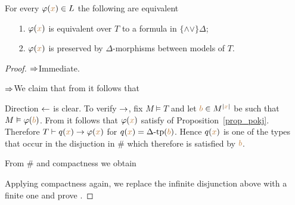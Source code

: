 \begin{lemma}\label{lem_qfdefinability}
For every $\varphi({\color{brown} x})\in L$ the following are equivalent
\begin{itemize}
\item[1.] $\varphi({\color{brown} x})$ is equivalent over $T$ to a formula in $\{\mathord\wedge\mathord\vee\}\Delta$;
\item[2.] $\varphi({\color{brown} x})$ is preserved by $\Delta$-morphisms between models of $T$.
\end{itemize}
\end{lemma}
\begin{proof} $\Rightarrow$\quad Immediate.

$\Rightarrow$\quad  We claim that from  it follows that



Direction $\leftarrow$ is clear. To verify $\rightarrow$, fix $M\models T$ and let ${\color{brown} b}\in M^{|{\color{brown} x}|}$ be such that $M\vDash\varphi({\color{brown} b})$.  From  it follows that $\varphi({\color{brown} x})$ satisfy  of Proposition~\ref{prop_pokj}. Therefore $T\vdash q({\color{brown} x})\rightarrow\varphi({\color{brown} x})$ for $q({\color{brown} x})=\Delta\mbox{-}\textrm{tp}({\color{brown} b})$. Hence $q({\color{brown} x})$ is one of the types that occur in the disjuction in $\#$ which therefore is satisfied by ${\color{brown} b}$.

From $\#$ and compactness we obtain


Applying compactness again, we replace the infinite disjunction above with a finite one and prove .
\end{proof}

% 

